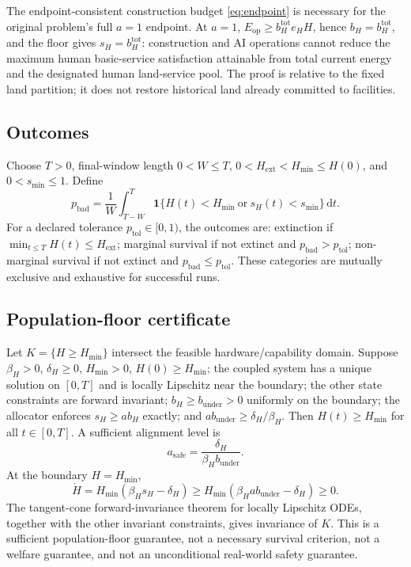 \documentclass[11pt]{article}
\newcommand{\dd}{\mathrm{d}}
\begin{document}
The endpoint-consistent construction budget \eqref{eq:endpoint} is necessary for the original problem's full $a=1$ endpoint. At $a=1$, $E_{\mathrm{op}}\ge b_H^{\mathrm{tot}}e_HH$, hence $b_H=b_H^{\mathrm{tot}}$, and the floor gives $s_H=b_H^{\mathrm{tot}}$: construction and AI operations cannot reduce the maximum human basic-service satisfaction attainable from total current energy and the designated human land-service pool. The proof is relative to the fixed land partition; it does not restore historical land already committed to facilities.

\subsection{Outcomes}
Choose $T>0$, final-window length $0<W\le T$, $0<H_{\mathrm{ext}}<H_{\min}\le H(0)$, and $0<s_{\min}\le1$. Define
\begin{equation}
p_{\mathrm{bad}}=\frac1W\int_{T-W}^{T}
\mathbf{1}\{H(t)<H_{\min}\ \text{or}\ s_H(t)<s_{\min}\}\,\dd t.
\label{eq:pbad}
\end{equation}
For a declared tolerance $p_{\mathrm{tol}}\in[0,1)$, the outcomes are: extinction if $\min_{t\le T}H(t)\le H_{\mathrm{ext}}$; marginal survival if not extinct and $p_{\mathrm{bad}}>p_{\mathrm{tol}}$; non-marginal survival if not extinct and $p_{\mathrm{bad}}\le p_{\mathrm{tol}}$. These categories are mutually exclusive and exhaustive for successful runs.

\subsection{Population-floor certificate}
Let $K=\{H\ge H_{\min}\}$ intersect the feasible hardware/capability domain. Suppose $\beta_H>0$, $\delta_H\ge0$, $H_{\min}>0$, $H(0)\ge H_{\min}$; the coupled system has a unique solution on $[0,T]$ and is locally Lipschitz near the boundary; the other state constraints are forward invariant; $b_H\ge b_{\mathrm{under}}>0$ uniformly on the boundary; the allocator enforces $s_H\ge ab_H$ exactly; and $ab_{\mathrm{under}}\ge\delta_H/\beta_H$. Then $H(t)\ge H_{\min}$ for all $t\in[0,T]$. A sufficient alignment level is
\begin{equation}
a_{\mathrm{safe}}=\frac{\delta_H}{\beta_Hb_{\mathrm{under}}}.
\label{eq:asafe}
\end{equation}
At the boundary $H=H_{\min}$,
\begin{equation}
\dot H=H_{\min}(\beta_Hs_H-\delta_H)
\ge H_{\min}(\beta_Hab_{\mathrm{under}}-\delta_H)\ge0.
\label{eq:boundary}
\end{equation}
The tangent-cone forward-invariance theorem for locally Lipschitz ODEs, together with the other invariant constraints, gives invariance of $K$. This is a sufficient population-floor guarantee, not a necessary survival criterion, not a welfare guarantee, and not an unconditional real-world safety guarantee.
\end{document}
